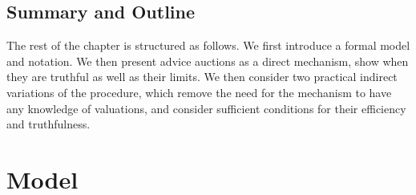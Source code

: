 






\subsection{Summary and Outline}


The rest of the chapter is structured as follows.
We first introduce a formal model and notation.
We then present advice auctions as a direct mechanism, show when they are truthful as well as their limits.
We then consider two practical indirect variations of the procedure, which remove the need for the mechanism to have any knowledge of valuations, and consider sufficient conditions for their efficiency and truthfulness.  



\section{Model}



